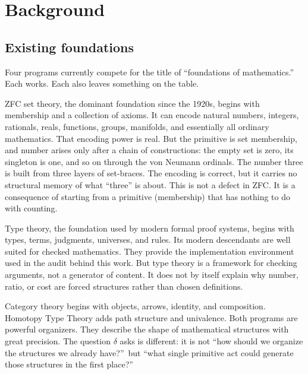 \documentclass[11pt,a4paper]{article}
\theoremstyle{definition}
\theoremstyle{remark}
\begin{document}
\section{Background}\label{sec:background}

\subsection{Existing foundations}

Four programs currently compete for the title of ``foundations of
mathematics.'' Each works. Each also leaves something on the table.

ZFC set theory, the dominant foundation since the 1920s, begins with
membership and a collection of axioms. It can encode natural numbers, integers,
rationals, reals, functions, groups, manifolds, and essentially all ordinary
mathematics. That encoding power is real. But the primitive is set membership,
and number arises only after a chain of constructions: the empty set is zero,
its singleton is one, and so on through the von Neumann ordinals. The number
three is built from three layers of set-braces. The encoding is correct, but it
carries no structural memory of what ``three'' is about. This is not a defect
in ZFC. It is a consequence of starting from a primitive (membership) that
has nothing to do with counting.

Type theory, the foundation used by modern formal proof systems, begins with types,
terms, judgments, universes, and rules. Its modern descendants are well suited
for checked mathematics. They provide the implementation environment used
in the audit behind this work. But type theory is a framework for checking arguments, not a
generator of content. It does not by itself explain why number, ratio, or cost
are forced structures rather than chosen definitions.

Category theory begins with objects, arrows, identity, and composition.
Homotopy Type Theory adds path structure and univalence. Both programs are
powerful organizers. They describe the shape of mathematical structures with
great precision. The question $\delta$ asks is different: it is not ``how
should we organize the structures we already have?''\ but ``what single
primitive act could generate those structures in the first place?''
\end{document}

